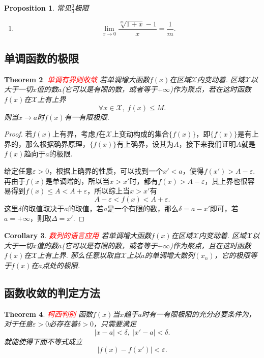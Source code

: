 \documentclass{article}
\newtheorem{theorem}{Theorem}[section]
\newtheorem{corollary}[theorem]{Corollary}
\newtheorem{proposition}[theorem]{Proposition}
\newcommand{\redt}[1]{\textcolor{red}{#1}}
\begin{document}
\begin{proposition}
\rm {\color{red}常见$\frac{0}{0}$极限}
\begin{enumerate}
	\item 
	$$
	\lim\limits_{x \rightarrow 0} \frac{\sqrt[m]{1+x}-1}{x} = \frac{1}{m}.
	$$
\end{enumerate}
\end{proposition}

\subsection{单调函数的极限}

\begin{theorem}
\rm \redt{单调有界则收敛} 若单调增大函数$f(x)$在区域$\mathcal{X}$内变动着. 区域$\mathcal{X}$以大于一切$x$值的数$a$(它可以是有限的数，或者等于$+\infty$)作为聚点，若在这时函数$f(x)$在$\mathcal{X}$上有上界
$$
\forall x \in \mathcal{X},\;f(x) \leq M.
$$
则当$x \rightarrow a$时$f(x)$有一有限极限. 
\end{theorem}

\begin{proof}
若$f(x)$上有界，考虑$f$在$\mathcal{X}$上变动构成的集合$\{f(x)\}$，即$\{f(x)\}$是有上界的，那么根据确界原理，$\{f(x)\}$有上确界，设其为$A$，接下来我们证明$A$就是$f(x)$趋向于$a$的极限.

给定任意$\varepsilon > 0$，根据上确界的性质，可以找到一个$x' < a$，使得$f(x') > A-\varepsilon$. 再由于$f(x)$是单调增的，所以当$x > x'$时，都有$f(x) > A -\varepsilon$，其上界也很容易得到$f(x) \leq A < A+\varepsilon$，所以综上当$x > x'$有
$$
A-\varepsilon < f(x) < A+\varepsilon.
$$
这里$\delta$的取值取决于$a$的取值，若$a$是一个有限的数，那么$\delta = a-x'$即可，若$a = +\infty$，则取$\Delta = x'$. 
\end{proof}

\begin{corollary}
\rm \redt{数列的语言应用} 若单调增大函数$f(x)$在区域$\mathcal{X}$内变动着. 区域$\mathcal{X}$以大于一切$x$值的数$a$(它可以是有限的数，或者等于$+\infty$)作为聚点，且在这时函数$f(x)$在$\mathcal{X}$上有上界. 那么任意以取自$\mathcal{X}$上以$a$的单调增大数列$(x_n)$，它的极限等于$f(x)$在$a$点处的极限. 
\end{corollary}


\subsection{函数收敛的判定方法}

\begin{theorem}
\rm \redt{柯西判别} 函数$f(x)$当$x$趋于$a$时有一有限极限的充分必要条件为，对于任意$\varepsilon > 0$必存在着$\delta > 0$，只需要满足
$$
|x-a| < \delta,\; |x'-a| < \delta.
$$
就能使得下面不等式成立
$$
|f(x)-f(x')| < \varepsilon.
$$
\end{theorem}
\end{document}

